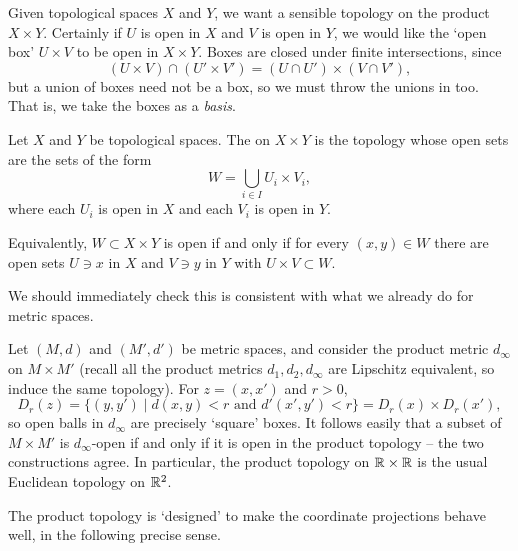 \documentclass[a4paper]{scrartcl}
\begin{document}
Given topological spaces $X$ and $Y$, we want a sensible topology on the product $X \times Y$. Certainly if $U$ is open in $X$ and $V$ is open in $Y$, we would like the `open box' $U \times V$ to be open in $X \times Y$. Boxes are closed under finite intersections, since
$$
(U \times V) \cap (U' \times V') = (U \cap U') \times (V \cap V'),
$$
but a union of boxes need not be a box, so we must throw the unions in too. That is, we take the boxes as a \emph{basis}.

\begin{definition}
    Let $X$ and $Y$ be topological spaces. The  on $X \times Y$ is the topology whose open sets are the sets of the form
    $$
    W = \bigcup_{i \in I} U_i \times V_i,
    $$
    where each $U_i$ is open in $X$ and each $V_i$ is open in $Y$.
\end{definition}

Equivalently, $W \subset X \times Y$ is open if and only if for every $(x, y) \in W$ there are open sets $U \ni x$ in $X$ and $V \ni y$ in $Y$ with $U \times V \subset W$.

We should immediately check this is consistent with what we already do for metric spaces.

\begin{example}
    Let $(M, d)$ and $(M', d')$ be metric spaces, and consider the product metric $d_{\infty}$ on $M \times M'$ (recall all the product metrics $d_1, d_2, d_{\infty}$ are Lipschitz equivalent, so induce the same topology). For $z = (x, x')$ and $r > 0$,
    $$
    D_r(z) = \{(y, y') \mid d(x, y) < r \text{ and } d'(x', y') < r\} = D_r(x) \times D_r(x'),
    $$
    so open balls in $d_\infty$ are precisely `square' boxes. It follows easily that a subset of $M \times M'$ is $d_{\infty}$-open if and only if it is open in the product topology -- the two constructions agree. In particular, the product topology on $\mathbb{R} \times \mathbb{R}$ is the usual Euclidean topology on $\mathbb{R}^2$.
\end{example}

The product topology is `designed' to make the coordinate projections behave well, in the following precise sense.
\end{document}
